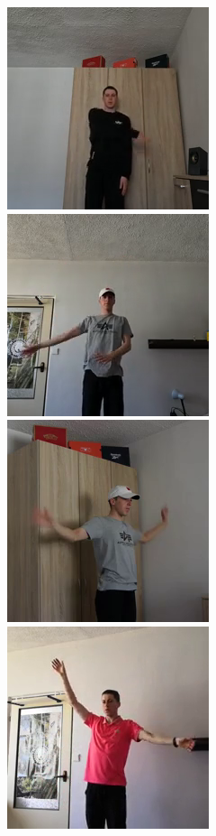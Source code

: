 \begin{figure}[!ht]
    \centerline{
        \includegraphics[scale=0.46]{figures/dataset_upper_body/scene026_cam1_image00169.png}
        \includegraphics[scale=0.46]{figures/dataset_upper_body/scene024_cam1_image00077.png}
        \includegraphics[scale=0.46]{figures/dataset_upper_body/scene025_cam0_image00037.png}
        \includegraphics[scale=0.46]{figures/dataset_upper_body/scene020_cam2_image00019.png}
}
\end{figure}
